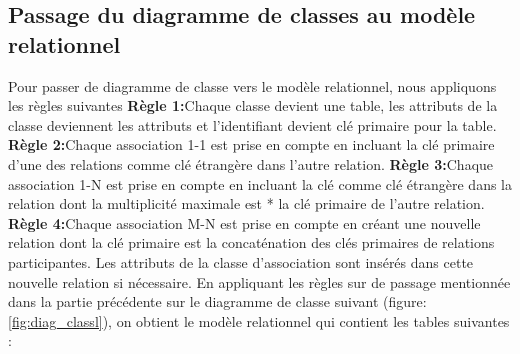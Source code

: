 \documentclass[edit,12pt,a4paper,ChapStyle,oneside,doubleinterligne]{report}
\begin{document}
\subsection{Passage du diagramme de classes au modèle relationnel }
Pour passer de diagramme de classe vers le modèle relationnel, nous appliquons les règles suivantes
\newline
\textbf{Règle 1:}Chaque classe devient une table, les attributs de la classe deviennent
les attributs et l’identifiant devient clé primaire pour la table.
\newline
\textbf{Règle 2:}Chaque association 1-1 est prise en compte en incluant la clé primaire
d’une des relations comme clé étrangère dans l’autre relation.
\newline
\textbf{Règle 3:}Chaque association 1-N est prise en compte en incluant la clé comme
clé étrangère dans la relation dont la multiplicité maximale est * la clé primaire
de l’autre relation.
\newline
\textbf{Règle 4:}Chaque association M-N est prise en compte en créant une nouvelle
relation dont la clé primaire est la concaténation des clés primaires de relations
participantes. Les attributs de la classe d’association sont insérés dans cette nouvelle relation si nécessaire.
\newline \phantom{hassane} \newline
En appliquant les règles sur de passage mentionnée dans la partie précédente sur le diagramme de classe suivant (figure: \ref{fig:diag_classl}), on obtient le modèle relationnel qui contient les tables suivantes :
\end{document}
